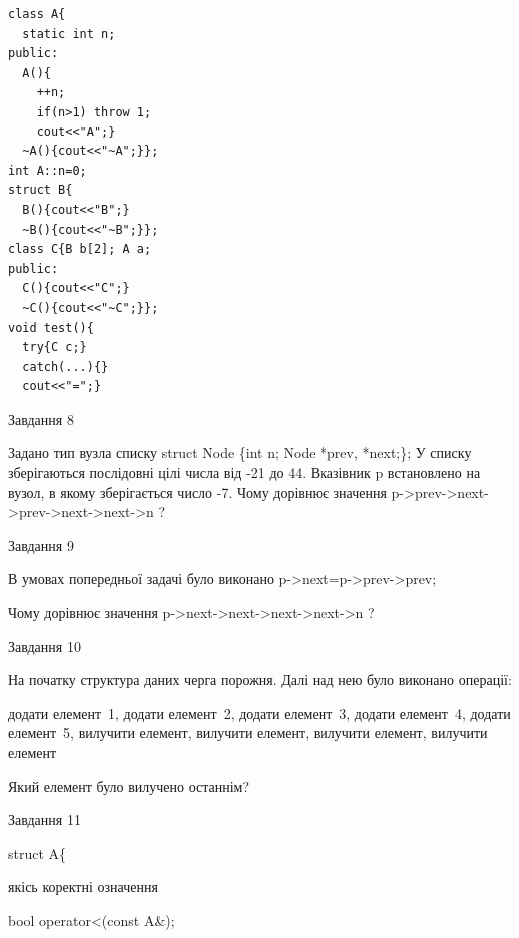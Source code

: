 \documentclass[12pt, ukrainian]{article}
\begin{document}
{{{{{{{{{{{\begin{minipage}[t]{7cm}
\begin{verbatim}
class A{
  static int n;
public:
  A(){
    ++n; 
    if(n>1) throw 1;
    cout<<"A";}
  ~A(){cout<<"~A";}};
int A::n=0;
struct B{
  B(){cout<<"B";}
  ~B(){cout<<"~B";}};
class C{B b[2]; A a;
public:
  C(){cout<<"C";}
  ~C(){cout<<"~C";}};
void test(){
  try{C c;} 
  catch(...){} 
  cout<<"=";}
\end{verbatim}            


\end{minipage}
               
{\begin{center}Завдання {8}\end{center}}
\vspace{-6mm}
Задано тип вузла списку
struct Node \{int n; Node *prev, *next;\};
У списку зберігаються послідовні цілі числа від -21 до 44. Вказівник p встановлено на вузол, в якому зберігається число -7.
Чому дорівнює значення p->prev->next->prev->next->next->n ?\par

               
{\begin{center}Завдання {9}\end{center}}
\vspace{-6mm}
В умовах попередньої задачі було виконано p->next=p->prev->prev;

Чому дорівнює значення p->next->next->next->next->n ?\par

\newpage
               
{\begin{center}Завдання {10}\end{center}}
\vspace{-6mm}
На початку структура даних черга порожня. Далі над нею було виконано операції:

додати елемент~1, додати елемент~2, додати елемент~3, додати елемент~4, додати елемент~5, вилучити елемент, вилучити елемент, вилучити елемент, вилучити елемент

Який елемент було вилучено останнім?\par

               
{\begin{center}Завдання {11}\end{center}}
\vspace{-6mm}

struct A\{

\quad  якісь коректні означення

\quad  bool operator<(const A\&);

}}}}}}}}}}}
\end{document}
